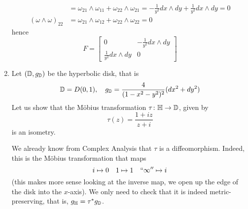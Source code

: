 \documentclass[a4paper, 12pt]{article}
\begin{document}
\begin{Exercise}
\begin{enumerate}[label=(\roman*)]
\begin{align*}
                &= \omega_{21}\wedge\omega_{11} + \omega_{22}\wedge\omega_{21}
                = -\frac{1}{y^2}dx \wedge dy + \frac{1}{y^2} dx \wedge dy
                = 0 \\
                (\omega\wedge\omega)_{22}
                &= \omega_{21}\wedge\omega_{12} + \omega_{22}\wedge\omega_{22}
                = 0
            \end{align*}
            hence
            \[
                F =
                \begin{bmatrix}
                    0 & -\frac{1}{y^2} dx \wedge dy \\
                    \frac{1}{y^2} dx \wedge dy & 0
                \end{bmatrix}
            \]
        \item Let $(\mathbb{D}, g_{\mathbb{D}})$ be the hyperbolic disk, that is
            \[
                \mathbb{D} = D(0, 1), \quad g_{\mathbb{D}} = \frac{4}{(1 - x^2 - y^2)^2}(dx^2 + dy^2)
            \]
            Let us show that the M\"obius transformation $\tau \colon \mathbb{H} \to \mathbb{D}$, given by
            \[
                \tau(z) = \frac{1 + iz}{z + i}
            \]
            is an isometry.

            We already know from Complex Analysis that $\tau$ is a diffeomorphism.
            Indeed, this is the M\"obius transformation that maps
            \[
                i \mapsto 0 \quad 1 \mapsto 1 \quad ``\infty'' \mapsto i
            \]
            (this makes more sense looking at the inverse map,
            we open up the edge of the disk into the $x$-axis).
            We only need to check that it is indeed metric-preserving,
            that is, $g_{\mathbb{H}} = \tau^* g_{\mathbb{D}}$.


\end{enumerate}
\end{Exercise}
\end{document}
